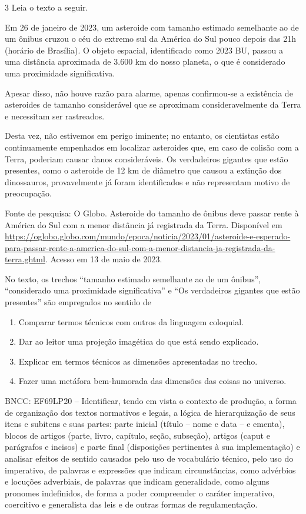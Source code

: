 \num{3} Leia o texto a seguir.

Em 26 de janeiro de 2023, um asteroide com tamanho estimado semelhante
ao de um ônibus cruzou o céu do extremo sul da América do Sul pouco
depois das 21h (horário de Brasília). O objeto espacial, identificado
como 2023 BU, passou a uma distância aproximada de 3.600 km do nosso
planeta, o que é considerado uma proximidade significativa.

Apesar disso, não houve razão para alarme, apenas confirmou-se a
existência de asteroides de tamanho considerável que se aproximam
consideravelmente da Terra e necessitam ser rastreados.

Desta vez, não estivemos em perigo iminente; no entanto, os cientistas
estão continuamente empenhados em localizar asteroides que, em caso de
colisão com a Terra, poderiam causar danos consideráveis. Os verdadeiros
gigantes que estão presentes, como o asteroide de 12 km de diâmetro que
causou a extinção dos dinossauros, provavelmente já foram identificados
e não representam motivo de preocupação.

Fonte de pesquisa: O Globo. Asteroide do tamanho de ônibus deve passar
rente à América do Sul com a menor distância já registrada da Terra.
Disponível em
\url{https://oglobo.globo.com/mundo/epoca/noticia/2023/01/asteroide-e-esperado-para-passar-rente-a-america-do-sul-com-a-menor-distancia-ja-registrada-da-terra.ghtml}.
Acesso em 13 de maio de 2023.

No texto, os trechos ``tamanho estimado semelhante ao de um ônibus'',
``considerado uma proximidade significativa'' e ``Os verdadeiros
gigantes que estão presentes'' são empregados no sentido de

\begin{enumerate}
\def\labelenumi{\alph{enumi})}
\item Comparar termos técnicos com outros da linguagem coloquial.
\item Dar ao leitor uma projeção imagética do que está sendo explicado.
\item Explicar em termos técnicos as dimensões apresentadas no trecho.
\item Fazer uma metáfora bem-humorada das dimensões das coisas no universo.
\end{enumerate}

BNCC: EF69LP20 -- Identificar, tendo em vista o contexto de produção, a
forma de organização dos textos normativos e legais, a lógica de
hierarquização de seus itens e subitens e suas partes: parte inicial
(título -- nome e data -- e ementa), blocos de artigos (parte, livro,
capítulo, seção, subseção), artigos (caput e parágrafos e incisos) e
parte final (disposições pertinentes à sua implementação) e analisar
efeitos de sentido causados pelo uso de vocabulário técnico, pelo uso do
imperativo, de palavras e expressões que indicam circunstâncias, como
advérbios e locuções adverbiais, de palavras que indicam generalidade,
como alguns pronomes indefinidos, de forma a poder compreender o caráter
imperativo, coercitivo e generalista das leis e de outras formas de
regulamentação.

